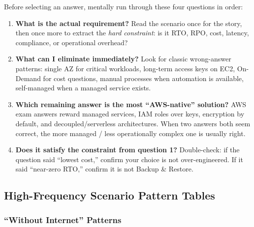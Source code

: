 \begin{examtip}[title={[!] Answering Strategy --- ask these four questions}]
Before selecting an answer, mentally run through these four questions in order:

\begin{enumerate}
  \item \textbf{What is the actual requirement?}
        Read the scenario once for the story, then once more to extract the \emph{hard constraint}:
        is it RTO, RPO, cost, latency, compliance, or operational overhead?

  \item \textbf{What can I eliminate immediately?}
        Look for classic wrong-answer patterns: single AZ for critical workloads,
        long-term access keys on EC2, On-Demand for cost questions, manual processes
        when automation is available, self-managed when a managed service exists.

  \item \textbf{Which remaining answer is the most ``AWS-native'' solution?}
        AWS exam answers reward managed services, IAM roles over keys, encryption by default,
        and decoupled/serverless architectures. When two answers both seem correct,
        the more managed / less operationally complex one is usually right.

  \item \textbf{Does it satisfy the constraint from question 1?}
        Double-check: if the question said ``lowest cost,'' confirm your choice is not
        over-engineered. If it said ``near-zero RTO,'' confirm it is not Backup \& Restore.
\end{enumerate}
\end{examtip}

\subsection{High-Frequency Scenario Pattern Tables}

\subsubsection{``Without Internet'' Patterns}


